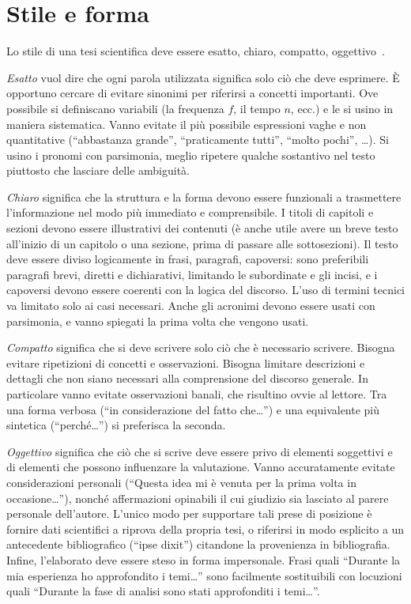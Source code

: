 \documentclass[12pt]{report}
\begin{document}
\section{Stile e forma}
\label{sec:forma}


Lo stile di una tesi scientifica deve essere esatto, chiaro, compatto, oggettivo~\cite{strunk1999style}.

{\em Esatto} vuol dire che ogni parola utilizzata significa solo ci\`o che deve esprimere. \`E opportuno cercare di evitare sinonimi per riferirsi a concetti importanti. Ove possibile si definiscano variabili (la frequenza $f$, il tempo $n$, ecc.) e le si usino in maniera sistematica. Vanno evitate il pi\`u possibile espressioni vaghe e non quantitative (``abbastanza grande'', ``praticamente tutti'', ``molto pochi'', \ldots). Si usino i pronomi con parsimonia, meglio ripetere qualche sostantivo nel testo piuttosto che lasciare delle ambiguit\`a.

{\em Chiaro} significa che la struttura e la forma devono essere funzionali a trasmettere l'informazione nel modo pi\`u immediato e comprensibile. I titoli di capitoli e sezioni devono essere illustrativi dei contenuti (\`e anche utile avere un breve testo all'inizio di un capitolo o una sezione, prima di passare alle sottosezioni). Il testo deve essere diviso logicamente in frasi, paragrafi, capoversi: sono preferibili paragrafi brevi, diretti e dichiarativi, limitando le subordinate e gli incisi, e i capoversi devono essere coerenti con la logica del discorso. L'uso di termini tecnici va limitato solo ai casi necessari. Anche gli acronimi devono essere usati con parsimonia, e vanno spiegati la prima volta che vengono usati. 

{\em Compatto} significa che si deve scrivere solo ci\`o che \`e necessario scrivere. Bisogna evitare ripetizioni di concetti e osservazioni. Bisogna limitare descrizioni e dettagli che non siano necessari alla comprensione del discorso generale. In particolare vanno evitate osservazioni banali, che risultino ovvie al lettore. Tra una forma verbosa (``in considerazione del fatto che\ldots'') e una equivalente pi\`u sintetica (``perch\'e\ldots'') si preferisca la seconda.

{\em Oggettivo} significa che ci\`o che si scrive deve essere privo di elementi soggettivi e di elementi che possono influenzare la valutazione. Vanno accuratamente evitate considerazioni personali (``Questa idea mi \`e venuta per la prima volta in occasione\ldots''), nonch\'e affermazioni opinabili il cui giudizio sia lasciato al parere personale dell'autore. L'unico modo per supportare tali prese di posizione è fornire dati scientifici a riprova della propria tesi, o riferirsi in modo esplicito a un antecedente bibliografico (``ipse dixit'') citandone la provenienza in bibliografia. Infine, l'elaborato deve essere steso in forma impersonale. Frasi quali ``Durante la mia esperienza ho approfondito i temi\dots'' sono facilmente sostituibili con locuzioni quali ``Durante la fase di analisi sono stati approfonditi i temi\dots''.
\end{document}
